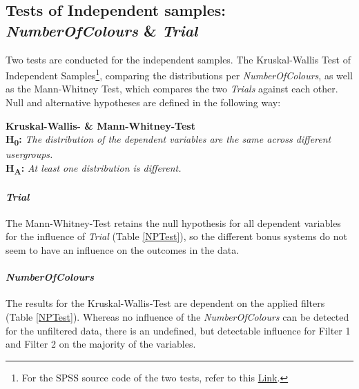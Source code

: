 \subsection{Tests of Independent samples: \textit{NumberOfColours} \& \textit{Trial}}
Two tests are conducted for the independent samples. The Kruskal-Wallis Test of Independent Samples\footnote{For the SPSS source code of the two tests, refer to this \href{http://publib.boulder.ibm.com/infocenter/spssstat/v20r0m0/topic/com.ibm.spss.statistics.help/alg_nonparametric_independent_wald-wolfowitz.htm}{Link}.}, comparing the distributions per \textit{NumberOfColours}, as well as the Mann-Whitney Test, which compares the two \textit{Trials} against each other.\\
Null and alternative hypotheses are defined in the following way: 

\textbf{Kruskal-Wallis- \& Mann-Whitney-Test} \\
\textbf{H\textsubscript{0}:} \textit{The distribution of the dependent variables are the same across different usergroups.}\\
\textbf{H\textsubscript{A}:} \textit{At least one distribution is different.}

\paragraph{\textit{Trial}}
The Mann-Whitney-Test retains the null hypothesis for all dependent variables for the influence of \textit{Trial} (Table \ref{NPTest}), so the different bonus systems do not seem to have an influence on the outcomes in the data.

\paragraph{\textit{NumberOfColours}}
The results for the Kruskal-Wallis-Test are dependent on the applied filters (Table \ref{NPTest}). Whereas no influence of the \textit{NumberOfColours} can be detected for the unfiltered data, there is an undefined, but detectable influence for Filter 1 and Filter 2 on the majority of the variables. 


